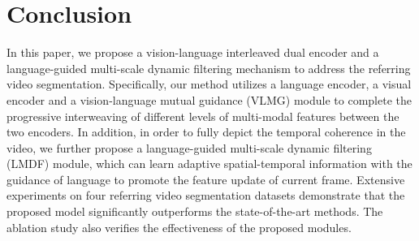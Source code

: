 \documentclass[10pt,twocolumn,letterpaper]{article}
\begin{document}
\section{Conclusion}
In this paper, we propose a vision-language interleaved dual encoder and a language-guided multi-scale dynamic filtering mechanism to address the referring video segmentation. Specifically, our method utilizes a language encoder, a visual encoder and a vision-language mutual guidance (VLMG) module to complete the progressive interweaving of different levels of multi-modal features between the two encoders. In addition, in order to fully depict the temporal coherence in the video, we further propose a language-guided multi-scale dynamic filtering (LMDF) module, which can learn adaptive spatial-temporal information with the guidance of language to promote the feature update of current frame.
Extensive experiments on four referring video segmentation datasets demonstrate that the proposed model significantly outperforms the state-of-the-art methods. The ablation study also verifies the effectiveness of the proposed modules.



{\small


}
\end{document}
